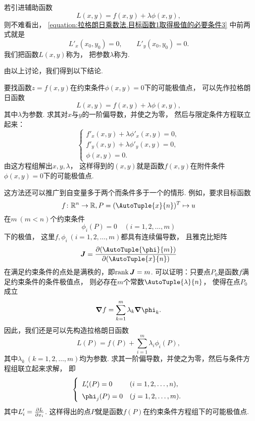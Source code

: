 若引进辅助函数\[
	L(x,y) = f(x,y) + \lambda \phi(x,y),
\]
则不难看出，
\cref{equation:拉格朗日乘数法.目标函数1取得极值的必要条件3} 中前两式就是\[
	L'_x(x_0,y_0)=0, \qquad
	L'_y(x_0,y_0)=0.
\]
我们把函数\(L(x,y)\)称为，
把参数\(\lambda\)称为.

由以上讨论，我们得到以下结论.

要找函数\(z=f(x,y)\)在约束条件\(\phi(x,y)=0\)下的可能极值点，
可以先作拉格朗日函数\[
	L(x,y) = f(x,y) + \lambda \phi(x,y),
\]
其中\(\lambda\)为参数.
求其对\(x\)与\(y\)的一阶偏导数，并使之为零，
然后与限定条件方程联立起来：\[
	\left\{ \begin{array}{l}
		f'_x(x,y)+\lambda\phi'_x(x,y)=0, \\
		f'_y(x,y)+\lambda\phi'_y(x,y)=0, \\
		\phi(x,y)=0.
	\end{array} \right.
\]
由这方程组解出\(x,y,\lambda\)，
这样得到的\((x,y)\)就是函数\(f(x,y)\)在附件条件\(\phi(x,y)=0\)下的可能极值点.

这方法还可以推广到自变量多于两个而条件多于一个的情形.
例如，要求目标函数\[
	f\colon \mathbb{R}^n \to \mathbb{R}, P = (\AutoTuple{x}{n})^T \mapsto u
\]在\(m\ (m<n)\)个约束条件\[
	\phi_i(P) = 0
	\quad(i=1,2,\dotsc,m)
\]下的极值，
这里\(f,\phi_i\ (i=1,2,\dotsc,m)\)都具有连续偏导数，
且雅克比矩阵\[
	\vb{J} = \jacobi{\AutoTuple{\phi}{m}}{\AutoTuple{x}{n}}
\]在满足约束条件的点处是满秩的，即\(\rank\boldsymbol{J} = m\).
可以证明：只要点\(P_0\)是函数\(f\)满足约束条件的条件极值点，
则必存在\(m\)个常数\(\AutoTuple{\lambda}{n}\)，
使得在点\(P_0\)成立\begin{equation}
	\grad f = \sum_{k=1}^m \lambda_k \grad \phi_k.
\end{equation}
因此，我们还是可以先构造拉格朗日函数\begin{equation}
	L(P) = f(P) + \sum_{i=1}^m \lambda_i \phi_i(P),
\end{equation}
其中\(\lambda_k\ (k=1,2,\dotsc,m)\)均为参数.
求其一阶偏导数，并使之为零，然后与条件方程组联立起来求解，
即\begin{equation}\label{equation:拉格朗日乘数法.可能极值点方程}
	\left\{ \def\arraystretch{1.5} \begin{array}{ll}
		L'_i(P) = 0 & (i=1,2,\dotsc,n), \\
		\phi_j(P) = 0 & (j=1,2,\dotsc,m).
	\end{array} \right.
\end{equation}
其中\(L'_i = \pdv{L}{x_i}\).
这样得出的点\(P\)就是函数\(f(P)\)在约束条件方程组下的可能极值点.

